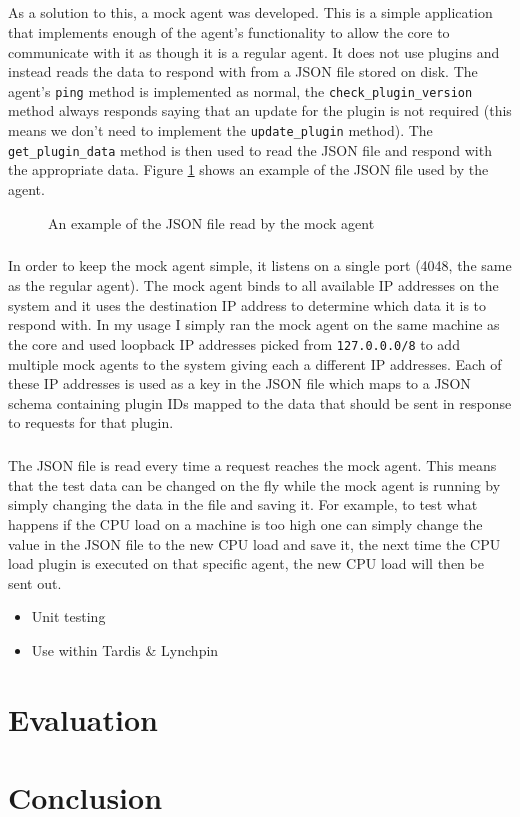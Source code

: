 \documentclass[bsc,logo,twoside,singlespacing]{infthesis}
\begin{document}
\paragraph*{}
	As a solution to this, a mock agent was developed.  This is a simple application
	that implements enough of the agent's functionality to allow the core to
	communicate with it as though it is a regular agent.  It does not use plugins
	and instead reads the data to respond with from a JSON file stored on disk. The
	agent's \texttt{ping} method is implemented as normal, the
	\texttt{check\_plugin\_version} method always responds saying that an update for
	the plugin is not required (this means we don't need to implement the
	\texttt{update\_plugin} method).  The \texttt{get\_plugin\_data} method is then
	used to read the JSON file and respond with the appropriate data. Figure
	\ref{mock-agent-data} shows an example of the JSON file used by the agent.
	
\begin{figure}[H]
	\caption{An example of the JSON file read by the mock agent}
	\label{mock-agent-data}
	
\end{figure}
	
\paragraph*{}
	In order to keep the mock agent simple, it listens on a single port (4048, the
	same as the regular agent).  The mock agent binds to all available IP addresses
	on the system and it uses the destination IP address to determine which data it
	is to respond with.  In my usage I simply ran the mock agent on the same machine
	as the core and used loopback IP addresses picked from \texttt{127.0.0.0/8} to
	add multiple mock agents to the system giving each a different IP addresses.
	Each of these IP addresses is used as a key in the JSON file which maps to a
	JSON schema containing plugin IDs mapped to the data that should be sent in
	response to requests for that plugin.
	
\paragraph*{}
	The JSON file is read every time a request reaches the mock agent.  This means
	that the test data can be changed on the fly while the mock agent is running by
	simply changing the data in the file and saving it.  For example, to test what
	happens if the CPU load on a machine is too high one can simply change the
	value in the JSON file to the new CPU load and save it, the next time the CPU
	load plugin is executed on that specific agent, the new CPU load will then be
	sent out.
	
\begin{itemize}
	\item Unit testing
	\item Use within Tardis \& Lynchpin
\end{itemize}

\chapter{Evaluation}

\chapter{Conclusion}
\end{document}
